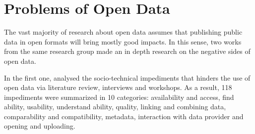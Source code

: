 



\section{Problems of Open Data}
\label{sec:problems}

The vast majority of research about open data assumes that publishing public data in open formats will bring mostly good impacts.
In this sense, two works from the same research group made an in depth research on the negative sides of open data.

In the first one,  analysed the socio-technical impediments that hinders the use of open data via literature review, interviews and workshops.
As a result, 118 impediments were summarized in 10 categories: availability and access, find ability, usability, understand ability, quality, linking and combining data, comparability and compatibility, metadata, interaction with data provider and opening and uploading.

